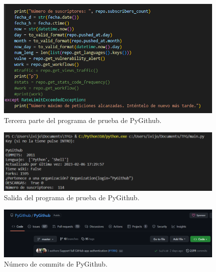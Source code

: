 \documentclass[a4paper, 12pt]{book}
\begin{document}
\begin{figure}
    \centering
    \includegraphics[width=1\textwidth, keepaspectratio]{img/pygithub_3.png}
    \caption{Tercera parte del programa de prueba de PyGithub.}\label{fig:pygithub_3}
\end{figure}

\begin{figure}
    \centering
    \includegraphics[width=1\textwidth, keepaspectratio]{img/pygithub_salida.png}
    \caption{Salida del programa de prueba de PyGithub.}\label{fig:pygithub_salida}
\end{figure}

\begin{figure}
    \centering
    \includegraphics[width=1\textwidth, keepaspectratio]{img/pygithub_commits.png}
    \caption{Número de commits de PyGithub.}\label{fig:pygithub_commits}
\end{figure}
\end{document}

